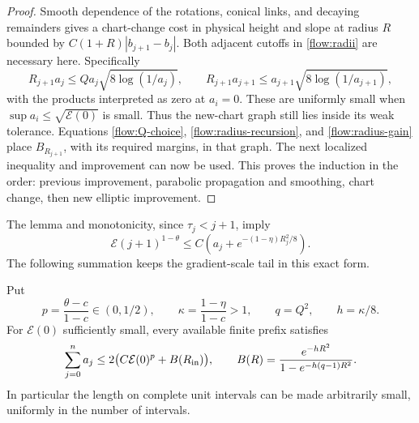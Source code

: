 \begin{proof}
Smooth dependence of the rotations, conical links, and decaying
remainders gives a chart-change cost in physical height and
slope at radius $R$ bounded by
$C(1+R)|b_{j+1}-b_j|$.  Both adjacent cutoffs in
\eqref{flow:radii} are necessary here.  Specifically
\[
 R_{j+1}a_j\le Q a_j\sqrt{8\log(1/a_j)},\qquad
 R_{j+1}a_{j+1}\le a_{j+1}\sqrt{8\log(1/a_{j+1})},
\]
with the products interpreted as zero at $a_i=0$.
These are uniformly small when $\sup a_i\le\sqrt{\mathcal E(0)}$ is
small.  Thus the new-chart graph still lies inside its weak
tolerance.  Equations \eqref{flow:Q-choice},
\eqref{flow:radius-recursion}, and \eqref{flow:radius-gain}
place $B_{R_{j+1}}$, with its required margins, in that graph.
The next localized inequality and improvement can now be used.
This proves the induction in the order: previous improvement,
parabolic propagation and smoothing, chart change, then new
elliptic improvement.
\end{proof}

The lemma and monotonicity, since $\tau_j<j+1$, imply
\begin{equation}\label{flow:discrete-gradient}
 \mathcal E(j+1)^{1-\theta}
 \le C\left(a_j+e^{-(1-\eta)R_j^2/8}\right).
\end{equation}
The following summation keeps the gradient-scale tail in this
exact form.

\begin{lemma}
\label{flow:finite-length}
Put
\[
 p=\frac{\theta-c}{1-c}\in(0,1/2),\qquad
 \kappa=\frac{1-\eta}{1-c}>1,\qquad q=Q^2,
 \qquad h=\kappa/8.
\]
For $\mathcal E(0)$ sufficiently small, every available finite prefix
satisfies
\begin{equation}\label{flow:length-bound}
 \sum_{j=0}^{n}a_j
 \le 2\bigl(C\mathcal E(0)^p+B(R_{\rm in})\bigr),\qquad
 B(R)=\frac{e^{-hR^2}}{1-e^{-h(q-1)R^2}}.
\end{equation}
In particular the length on complete unit intervals can be
made arbitrarily small, uniformly in the number of intervals.
\end{lemma}

